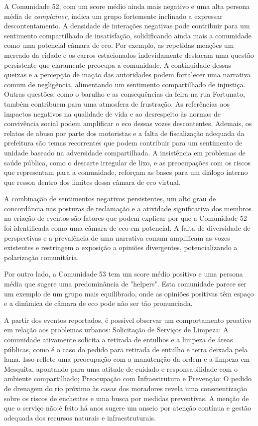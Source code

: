 A Comunidade 52, com um score médio ainda mais negativo e uma alta persona média de \textit{complainer}, indica um grupo fortemente inclinado a expressar descontentamento. A densidade de interações negativas pode contribuir para um sentimento compartilhado de insatisfação, solidificando ainda mais a comunidade como uma potencial câmara de eco. Por exemplo, as repetidas menções um mercado da cidade e os carros estacionados indevidamente destacam uma questão persistente que claramente preocupa a comunidade. A continuidade dessas queixas e a percepção de inação das autoridades podem fortalecer uma narrativa comum de negligência, alimentando um sentimento compartilhado de injustiça. Outras questões, como o barulho e as consequências da feira na rua Fortunato, também contribuem para uma atmosfera de frustração. As referências aos impactos negativos na qualidade de vida e ao desrespeito às normas de convivência social podem amplificar o eco dessas vozes descontentes. Ademais, os relatos de abuso por parte dos motoristas e a falta de fiscalização adequada da prefeitura são temas recorrentes que podem contribuir para um sentimento de unidade baseado na adversidade compartilhada. A insistência em problemas de saúde pública, como o descarte irregular de lixo, e as preocupações com os riscos que representam para a comunidade, reforçam as bases para um diálogo interno que ressoa dentro dos limites dessa câmara de eco virtual.

A combinação de sentimentos negativos persistentes, um alto grau de concordância nas posturas de reclamação e a atividade significativa dos membros na criação de eventos são fatores que podem explicar por que a Comunidade 52 foi identificada como uma câmara de eco em potencial. A falta de diversidade de perspectivas e a prevalência de uma narrativa comum amplificam as vozes existentes e restringem a exposição a opiniões divergentes, potencializando a polarização comunitária.

Por outro lado, a Comunidade 53 tem um score médio positivo e uma persona média que sugere uma predominância de "helpers". Esta comunidade parece ser um exemplo de um grupo mais equilibrado, onde as opiniões positivas têm espaço e a dinâmica de câmara de eco pode não ser tão pronunciada.

A partir dos eventos reportados, é possível observar um comportamento proativo em relação aos problemas urbanos: Solicitação de Serviços de Limpeza: A comunidade ativamente solicita a retirada de entulhos e a limpeza de áreas públicas, como é o caso do pedido para retirada de entulho e terra deixada pela lama. Isso reflete uma preocupação com a manutenção da ordem e a limpeza em Mesquita, apontando para uma atitude de cuidado e responsabilidade com o ambiente compartilhado; Preocupação com Infraestrutura e Prevenção: O pedido de drenagem do rio próximo às casas dos moradores revela uma conscientização sobre os riscos de enchentes e uma busca por medidas preventivas. A menção de que o serviço não é feito há anos sugere um anseio por atenção contínua e gestão adequada dos recursos naturais e infraestruturais.

